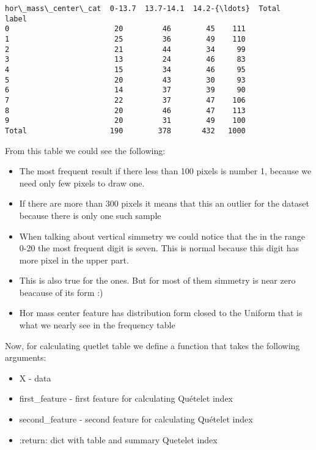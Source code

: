             \begin{tcolorbox}[breakable, size=fbox, boxrule=.5pt, pad at break*=1mm, opacityfill=0]
\begin{Verbatim}[commandchars=\\\{\}]
hor\_mass\_center\_cat  0-13.7  13.7-14.1  14.2-{\ldots}  Total
label
0                        20         46        45    111
1                        25         36        49    110
2                        21         44        34     99
3                        13         24        46     83
4                        15         34        46     95
5                        20         43        30     93
6                        14         37        39     90
7                        22         37        47    106
8                        20         46        47    113
9                        20         31        49    100
Total                   190        378       432   1000
\end{Verbatim}
\end{tcolorbox}
        
    From this table we could see the following:

\begin{itemize}
\item
  The most frequent result if there less than 100 pixels is number 1,
  because we need only few pixels to draw one.
\item
  If there are more than 300 pixels it means that this an outlier for
  the dataset because there is only one such sample
\item
  When talking about vertical simmetry we could notice that the in the
  range 0-20 the most frequent digit is seven. This is normal because
  this digit has more pixel in the upper part.
\item
  This is also true for the ones. But for most of them simmetry is near
  zero beacause of its form :)
\item
  Hor mass center feature has distribution form closed to the Uniform
  that is what we nearly see in the frequency table
\end{itemize}

Now, for calculating quetlet table we define a function that takes the
following arguments:

\begin{itemize}
\item
  X - data
\item
  first\_feature - first feature for calculating Quételet index
\item
  second\_feature - second feature for calculating Quételet index
\item
  :return: dict with table and summary Quetelet index
\end{itemize}

